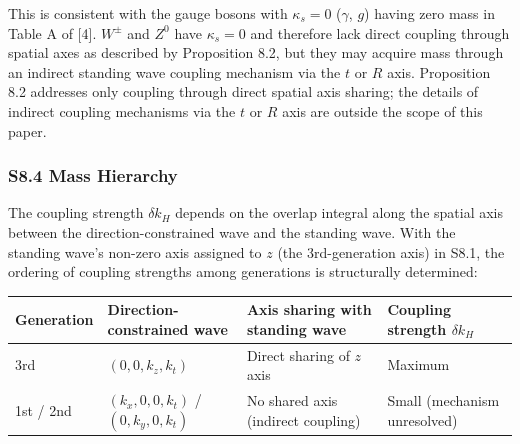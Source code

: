 \documentclass[
  a4paper,11pt]{article}
\newcounter{none}
\theoremstyle{definition}
\theoremstyle{remark}
\begin{document}
This is consistent with the gauge bosons with \(\kappa_s = 0\)
(\(\gamma\), \(g\)) having zero mass in Table A of {[}4{]}. \(W^{\pm}\)
and \(Z^0\) have \(\kappa_s = 0\) and therefore lack direct coupling
through spatial axes as described by Proposition 8.2, but they may
acquire mass through an indirect standing wave coupling mechanism via
the \(t\) or \(R\) axis. Proposition 8.2 addresses only coupling through
direct spatial axis sharing; the details of indirect coupling mechanisms
via the \(t\) or \(R\) axis are outside the scope of this paper.

\subsubsection{S8.4 Mass Hierarchy}\label{s8.4-mass-hierarchy}

The coupling strength \(\delta k_H\) depends on the overlap integral
along the spatial axis between the direction-constrained wave and the
standing wave. With the standing wave's non-zero axis assigned to \(z\)
(the 3rd-generation axis) in S8.1, the ordering of coupling strengths
among generations is structurally determined:

{\def\LTcaptype{none} %
\begin{longtable}[]{@{}
  >{\raggedright\arraybackslash}p{}
  >{\raggedright\arraybackslash}p{}
  >{\raggedright\arraybackslash}p{}
  >{\raggedright\arraybackslash}p{}@{}}
\toprule\noalign{}
\begin{minipage}[b]{\linewidth}\raggedright
Generation
\end{minipage} & \begin{minipage}[b]{\linewidth}\raggedright
Direction-constrained wave
\end{minipage} & \begin{minipage}[b]{\linewidth}\raggedright
Axis sharing with standing wave
\end{minipage} & \begin{minipage}[b]{\linewidth}\raggedright
Coupling strength \(\delta k_H\)
\end{minipage} \\
\midrule\noalign{}
\endhead
\bottomrule\noalign{}
\endlastfoot
3rd & \((0, 0, k_z, k_t)\) & Direct sharing of \(z\) axis & Maximum \\
1st / 2nd & \((k_x, 0, 0, k_t)\) / \((0, k_y, 0, k_t)\) & No shared axis
(indirect coupling) & Small (mechanism unresolved) \\
\end{longtable}
}
\end{document}
